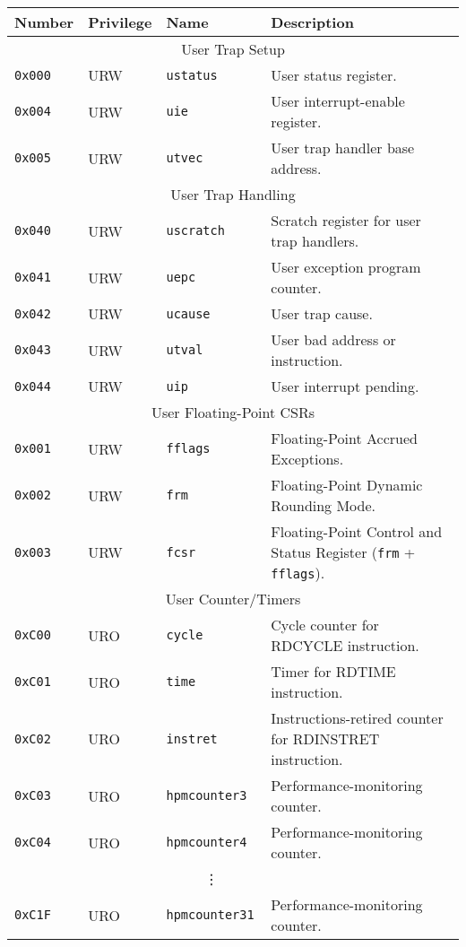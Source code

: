 \begin{table}[htb!]
\begin{center}
\begin{tabular}{|l|l|l|l|}
\hline
Number    & Privilege & Name & Description \\
\hline
\multicolumn{4}{|c|}{User Trap Setup} \\
\hline
\tt 0x000 & URW  &\tt ustatus    & User status register. \\
\tt 0x004 & URW  &\tt uie        & User interrupt-enable register. \\
\tt 0x005 & URW  &\tt utvec      & User trap handler base address. \\
\hline
\multicolumn{4}{|c|}{User Trap Handling} \\
\hline
\tt 0x040 & URW  &\tt uscratch   & Scratch register for user trap handlers. \\
\tt 0x041 & URW  &\tt uepc       & User exception program counter. \\
\tt 0x042 & URW  &\tt ucause     & User trap cause. \\
\tt 0x043 & URW  &\tt utval      & User bad address or instruction. \\
\tt 0x044 & URW  &\tt uip        & User interrupt pending. \\
\hline
\multicolumn{4}{|c|}{User Floating-Point CSRs} \\
\hline
\tt 0x001 & URW  &\tt fflags     & Floating-Point Accrued Exceptions. \\
\tt 0x002 & URW  &\tt frm        & Floating-Point Dynamic Rounding Mode. \\
\tt 0x003 & URW  &\tt fcsr       & Floating-Point Control and Status
Register ({\tt frm} + {\tt fflags}). \\
\hline
\multicolumn{4}{|c|}{User Counter/Timers} \\
\hline
\tt 0xC00 & URO  &\tt cycle         & Cycle counter for RDCYCLE instruction. \\
\tt 0xC01 & URO  &\tt time          & Timer for RDTIME instruction. \\
\tt 0xC02 & URO  &\tt instret       & Instructions-retired counter for RDINSTRET instruction. \\
\tt 0xC03 & URO  &\tt hpmcounter3   & Performance-monitoring counter. \\
\tt 0xC04 & URO  &\tt hpmcounter4   & Performance-monitoring counter. \\
& & \multicolumn{1}{c|}{\vdots} & \ \\
\tt 0xC1F & URO  &\tt hpmcounter31  & Performance-monitoring counter. \\

\end{tabular}
\end{center}
\end{table}
